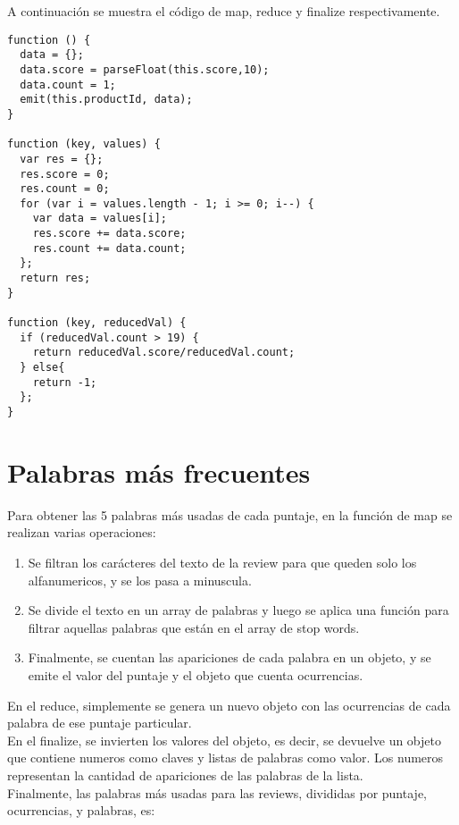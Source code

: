 \documentclass{article}
\begin{document}
A continuaci\'on se muestra el c\'odigo de map, reduce y finalize respectivamente.

\begin{lstlisting}
function () {
  data = {};
  data.score = parseFloat(this.score,10);
  data.count = 1;
  emit(this.productId, data);
}

function (key, values) {
  var res = {};
  res.score = 0;
  res.count = 0;
  for (var i = values.length - 1; i >= 0; i--) {
    var data = values[i];
    res.score += data.score;
    res.count += data.count;
  };
  return res;
}

function (key, reducedVal) {
  if (reducedVal.count > 19) {
    return reducedVal.score/reducedVal.count; 
  } else{
    return -1;
  };
}
\end{lstlisting}

\section{Palabras m\'as frecuentes}

\indent Para obtener las 5 palabras m\'as usadas de cada puntaje, en la funci\'on de map se realizan varias operaciones:

\begin{enumerate}
  \item Se filtran los car\'acteres del texto de la review para que queden solo los alfanumericos, y se los pasa a minuscula.

  \item Se divide el texto en un array de palabras y luego se aplica una funci\'on para filtrar aquellas palabras que est\'an en el array de stop words.

  \item Finalmente, se cuentan las apariciones de cada palabra en un objeto, y se emite el valor del puntaje y el objeto que cuenta ocurrencias.
\end{enumerate}

\indent En el reduce, simplemente se genera un nuevo objeto con las ocurrencias de cada palabra de ese puntaje particular.
\\\indent En el finalize, se invierten los valores del objeto, es decir, se devuelve un objeto que contiene numeros como claves y listas de palabras como valor. Los numeros representan la cantidad de apariciones de las palabras de la lista.
\\\indent Finalmente, las palabras m\'as usadas para las reviews, divididas por puntaje, ocurrencias, y palabras, es:
\end{document}
